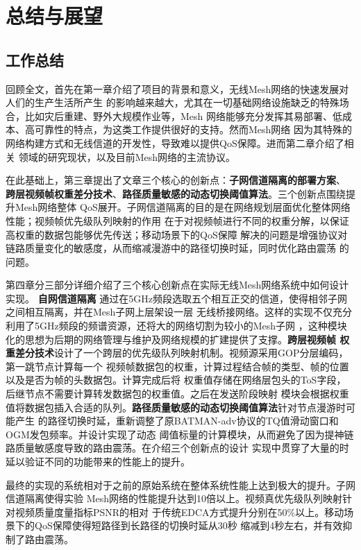 \chapter{总结与展望}
\label{cha:conclusion}

\section{工作总结}
回顾全文，首先在第一章介绍了项目的背景和意义，无线Mesh网络的快速发展对人们的生产生活所产生
的影响越来越大，尤其在一切基础网络设施缺乏的特殊场合，比如灾后重建、野外大规模作业等，Mesh
网络能够充分发挥其易部署、低成本、高可靠性的特点，为这类工作提供很好的支持。然而Mesh网络
因为其特殊的网络构建方式和无线信道的开发性，导致难以提供QoS保障。进而第二章介绍了相关
领域的研究现状，以及目前Mesh网络的主流协议。

在此基础上，第三章提出了文章三个核心的创新点：\textbf{子网信道隔离的部署方案}、
\textbf{跨层视频帧权重差分技术}、\textbf{路径质量敏感的动态切换阈值算法}。三个创新点围绕提升Mesh网络整体
QoS展开。子网信道隔离的目的是在网络规划层面优化整体网络性能；视频帧优先级队列映射的作用
在于对视频帧进行不同的权重分解，以保证高权重的数据包能够优先传送；移动场景下的QoS保障
解决的问题是增强协议对链路质量变化的敏感度，从而缩减漫游中的路径切换时延，同时优化路由震荡
的问题。

第四章分三部分详细介绍了三个核心创新点在实际无线Mesh网络系统中如何设计实现。\textbf{
自网信道隔离}
通过在5GHz频段选取五个相互正交的信道，使得相邻子网之间相互隔离，并在Mesh子网上层架设一层
无线桥接网络。这样的实现不仅充分利用了5GHz频段的频谱资源，还将大的网络切割为较小的Mesh子网
，这种模块化的思想为后期的网络管理与维护及网络规模的扩建提供了支撑。\textbf{跨层视频帧
权重差分技术}设计了一个跨层的优先级队列映射机制。视频源采用GOP分层编码，第一跳节点计算每一个
视频帧数据包的权重，计算过程结合帧的类型、帧的位置以及是否为帧的头数据包。计算完成后将
权重值存储在网络层包头的ToS字段，后继节点不需要计算转发数据包的权重值。之后在发送阶段映射
模块会根据权重值将数据包插入合适的队列。\textbf{路径质量敏感的动态切换阈值算法}针对节点漫游时可能产生
的路径切换时延，重新调整了原BATMAN-adv协议的TQ值滑动窗口和OGM发包频率。并设计实现了动态
阈值标量的计算模块，从而避免了因为提神链路质量敏感度导致的路由震荡。在介绍三个创新点的设计
实现中贯穿了大量的时延以验证不同的功能带来的性能上的提升。

最终的实现的系统相对于之前的原始系统在整体系统性能上达到极大的提升。子网信道隔离使得实验
Mesh网络的性能提升达到10倍以上。视频真优先级队列映射针对视频质量度量指标PSNR的相对
于传统EDCA方式提升分别在50\%以上。移动场景下的QoS保障使得短路径到长路径的切换时延从30秒
缩减到4秒左右，并有效抑制了路由震荡。

